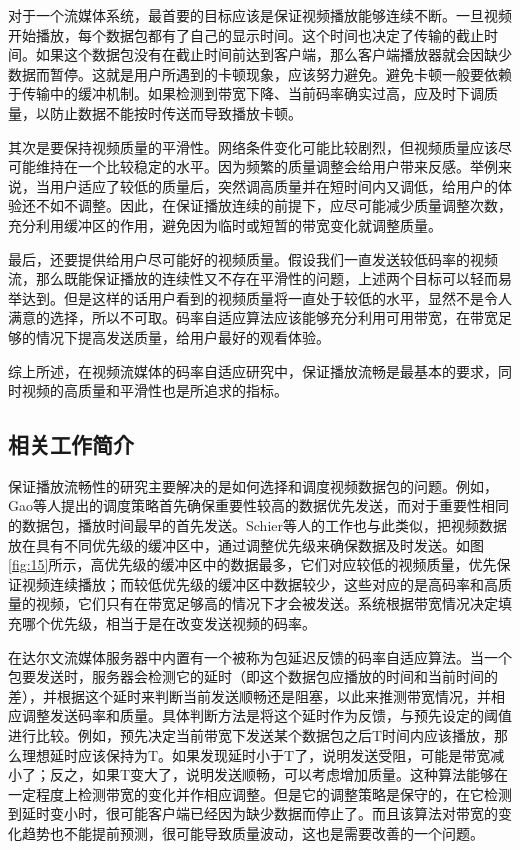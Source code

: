 对于一个流媒体系统，最首要的目标应该是保证视频播放能够连续不断。一旦视频开始播放，每个数据包都有了自己的显示时间。这个时间也决定了传输的截止时间。如果这个数据包没有在截止时间前达到客户端，那么客户端播放器就会因缺少数据而暂停。这就是用户所遇到的卡顿现象，应该努力避免。避免卡顿一般要依赖于传输中的缓冲机制。如果检测到带宽下降、当前码率确实过高，应及时下调质量，以防止数据不能按时传送而导致播放卡顿。

其次是要保持视频质量的平滑性。网络条件变化可能比较剧烈，但视频质量应该尽可能维持在一个比较稳定的水平。因为频繁的质量调整会给用户带来反感。举例来说，当用户适应了较低的质量后，突然调高质量并在短时间内又调低，给用户的体验还不如不调整。因此，在保证播放连续的前提下，应尽可能减少质量调整次数，充分利用缓冲区的作用，避免因为临时或短暂的带宽变化就调整质量。

最后，还要提供给用户尽可能好的视频质量。假设我们一直发送较低码率的视频流，那么既能保证播放的连续性又不存在平滑性的问题，上述两个目标可以轻而易举达到。但是这样的话用户看到的视频质量将一直处于较低的水平，显然不是令人满意的选择，所以不可取。码率自适应算法应该能够充分利用可用带宽，在带宽足够的情况下提高发送质量，给用户最好的观看体验。

综上所述，在视频流媒体的码率自适应研究中，保证播放流畅是最基本的要求，同时视频的高质量和平滑性也是所追求的指标。

\subsection{相关工作简介}

保证播放流畅性的研究主要解决的是如何选择和调度视频数据包的问题。例如，Gao等人\supercite{Gao2006}提出的调度策略首先确保重要性较高的数据优先发送，而对于重要性相同的数据包，播放时间最早的首先发送。Schier等人的工作\supercite{Schierl2010}也与此类似，把视频数据放在具有不同优先级的缓冲区中，通过调整优先级来确保数据及时发送。如图\ref{fig:15}\supercite{Schierl2010}所示，高优先级的缓冲区中的数据最多，它们对应较低的视频质量，优先保证视频连续播放；而较低优先级的缓冲区中数据较少，这些对应的是高码率和高质量的视频，它们只有在带宽足够高的情况下才会被发送。系统根据带宽情况决定填充哪个优先级，相当于是在改变发送视频的码率。

在达尔文流媒体服务器中内置有一个被称为包延迟反馈的码率自适应算法。当一个包要发送时，服务器会检测它的延时（即这个数据包应播放的时间和当前时间的差），并根据这个延时来判断当前发送顺畅还是阻塞，以此来推测带宽情况，并相应调整发送码率和质量。具体判断方法是将这个延时作为反馈，与预先设定的阈值进行比较。例如，预先决定当前带宽下发送某个数据包之后T时间内应该播放，那么理想延时应该保持为T。如果发现延时小于T了，说明发送受阻，可能是带宽减小了；反之，如果T变大了，说明发送顺畅，可以考虑增加质量。这种算法能够在一定程度上检测带宽的变化并作相应调整。但是它的调整策略是保守的，在它检测到延时变小时，很可能客户端已经因为缺少数据而停止了。而且该算法对带宽的变化趋势也不能提前预测，很可能导致质量波动，这也是需要改善的一个问题。

